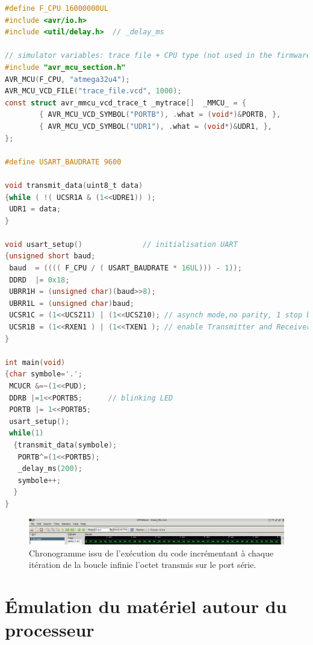 \documentclass[a4paper]{article}
\begin{document}
\begin{lstlisting}[language=C]
#define F_CPU 16000000UL
#include <avr/io.h>
#include <util/delay.h>  // _delay_ms

// simulator variables: trace file + CPU type (not used in the firmware)
#include "avr_mcu_section.h"     
AVR_MCU(F_CPU, "atmega32u4"); 
AVR_MCU_VCD_FILE("trace_file.vcd", 1000);
const struct avr_mmcu_vcd_trace_t _mytrace[]  _MMCU_ = {
        { AVR_MCU_VCD_SYMBOL("PORTB"), .what = (void*)&PORTB, },
        { AVR_MCU_VCD_SYMBOL("UDR1"), .what = (void*)&UDR1, },
};

#define USART_BAUDRATE 9600

void transmit_data(uint8_t data)
{while ( !( UCSR1A & (1<<UDRE1)) );
 UDR1 = data;
}

void usart_setup()              // initialisation UART
{unsigned short baud;
 baud  = (((( F_CPU / ( USART_BAUDRATE * 16UL))) - 1));
 DDRD  |= 0x18;
 UBRR1H = (unsigned char)(baud>>8);
 UBRR1L = (unsigned char)baud;
 UCSR1C = (1<<UCSZ11) | (1<<UCSZ10); // asynch mode,no parity, 1 stop bit, 8 bit size
 UCSR1B = (1<<RXEN1 ) | (1<<TXEN1 ); // enable Transmitter and Receiver
}

int main(void)
{char symbole='.';
 MCUCR &=~(1<<PUD);
 DDRB |=1<<PORTB5;      // blinking LED
 PORTB |= 1<<PORTB5;
 usart_setup();
 while(1)
  {transmit_data(symbole);
   PORTB^=(1<<PORTB5);
   _delay_ms(200);
   symbole++;
  }
}
\end{lstlisting}

\begin{figure}[h!tb]
\includegraphics[width=\linewidth]{projet_sur_simavr/rs232_wave.png}
\caption{Chronogramme issu de l'ex\'ecution du code incr\'ementant \`a chaque
it\'eration de la boucle infinie l'octet transmis sur le port s\'erie.}
\label{f1}
\end{figure}

\section{\'Emulation du mat\'eriel autour du processeur}
\end{document}
